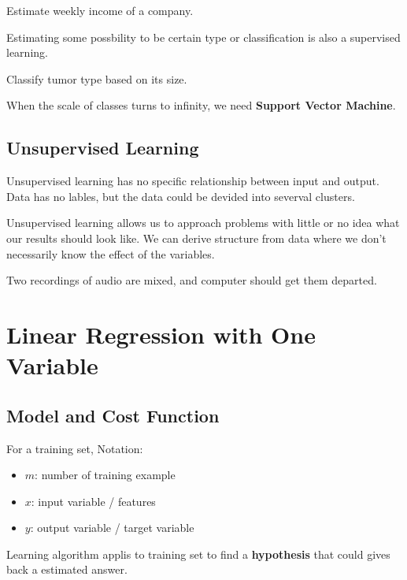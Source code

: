 \documentclass[en,11pt,english,black,simple]{../elegantbook}
\begin{document}
\begin{example}
    Estimate weekly income of a company.
\end{example}

Estimating some possbility to be certain type or classification is also a supervised learning. 

\begin{example}
    Classify tumor type based on its size.
\end{example}

When the scale of classes turns to infinity, we need \textbf{Support Vector Machine}. 

\subsection{Unsupervised Learning}

Unsupervised learning has no specific relationship between input and output. Data has no lables, but the data could be devided into severval clusters.

Unsupervised learning allows us to approach problems with little or no idea what our results should look like. We can derive structure from data where we don't necessarily know the effect of the variables.

\begin{example}
    Two recordings of audio are mixed, and computer should get them departed.
\end{example}

\section{Linear Regression with One Variable}

\subsection{Model and Cost Function}

For a training set, Notation:

\begin{itemize}
    \item \(m\): number of training example
    \item \(x\): input variable / features
    \item \(y\): output variable / target variable
\end{itemize}

Learning algorithm applis to training set to find a \textbf{hypothesis} that could gives back a estimated answer. 
\end{document}
